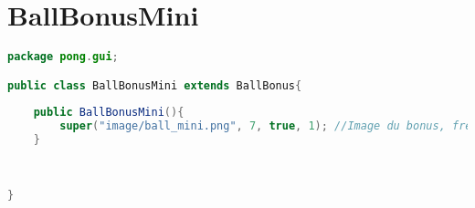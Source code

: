 \section{BallBonusMini}
\begin{lstlisting}[language=Java]
package pong.gui;

public class BallBonusMini extends BallBonus{
	
	public BallBonusMini(){
		super("image/ball_mini.png", 7, true, 1); //Image du bonus, frequence, malus, numBonus
	}
	
	

}
\end{lstlisting}